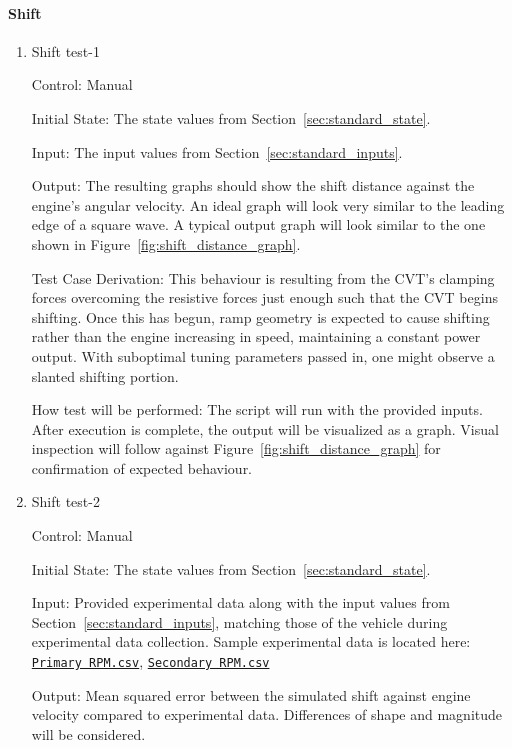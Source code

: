 \documentclass[12pt, titlepage]{article}
\newcommand{\refdata}[2]{
  \href{https://github.com/gr812b/CVT-Simulator/blob/main/experimental-data/#1
  }{\texttt{#2}}}
\begin{document}
\paragraph{Shift}

\begin{enumerate}
  
  \item{Shift test-1\\}
  
  Control: Manual
            
  Initial State: The state values from Section~\ref{sec:standard_state}.
  
  Input: The input values from Section~\ref{sec:standard_inputs}.
            
  Output: The resulting graphs should show the shift distance against the engine's angular velocity. An ideal graph will look very similar to the leading edge of a square wave. A typical output graph will look similar to the one shown in Figure~\ref{fig:shift_distance_graph}.
  
  Test Case Derivation: This behaviour is resulting from the CVT's clamping forces overcoming the resistive forces just enough such that the CVT begins shifting. Once this has begun, ramp geometry is expected to cause shifting rather than the engine increasing in speed, maintaining a constant power output. With suboptimal tuning parameters passed in, one might observe a slanted shifting portion.
  
  How test will be performed: The script will run with the provided inputs. After execution is complete, the output will be visualized as a graph. Visual inspection will follow against Figure~\ref{fig:shift_distance_graph} for confirmation of expected behaviour.
  
  \item{Shift test-2\\}

  Control: Manual

  Initial State: The state values from Section~\ref{sec:standard_state}.

  Input: Provided experimental data along with the input values from Section~\ref{sec:standard_inputs}, matching those of the vehicle during experimental data collection. Sample experimental data is located here: \refdata{RPM\%20PRIM.csv}{Primary RPM.csv}, \refdata{RPM\%20SEC.csv}{Secondary RPM.csv} 

  Output: Mean squared error between the simulated shift against engine velocity compared to experimental data. Differences of shape and magnitude will be considered.


\end{enumerate}
\end{document}
